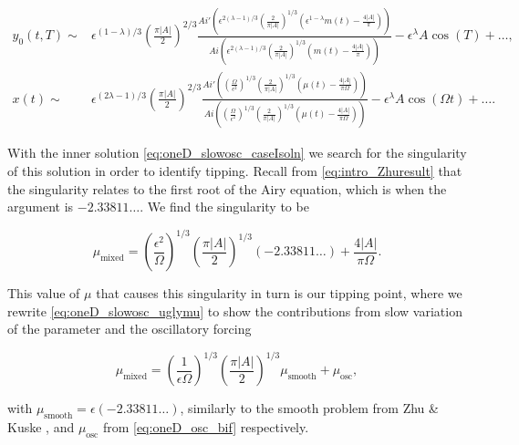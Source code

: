 \begin{equation}\label{eq:oneD_slowosc_caseIsoln}
\begin{aligned}
y_0(t,T)\sim& \epsilon^{(1-\lambda)/3}\left( \frac{\pi |A|}{2} \right)^{2/3}\frac{Ai'\left(\epsilon^{2(\lambda-1)/3}\left(\frac{2}{\pi |A|}\right)^{1/3}(\epsilon^{1-\lambda}m(t)-\frac{4|A|}{\pi})\right)}{Ai\left(\epsilon^{2(\lambda-1)/3}\left(\frac{2}{\pi |A|}\right)^{1/3}(m(t)-\frac{4|A|}{\pi})\right)}-\epsilon^\lambda A\cos(T)+\ldots,\\
x(t) \sim& \epsilon^{(2\lambda-1)/3}\left(\frac{\pi |A|}{2}\right)^{2/3}\frac{Ai'\left(\left(\frac{\Omega}{\epsilon^2}\right)^{1/3}\left(\frac{2}{\pi |A|}\right)^{1/3}(\mu(t)-\frac{4|A|}{\pi \Omega})\right)}{Ai\left(\left(\frac{\Omega}{\epsilon^2}\right)^{1/3}\left(\frac{2}{\pi |A|}\right)^{1/3}(\mu(t)-\frac{4|A|}{\pi \Omega})\right)}-\epsilon^\lambda A\cos(\Omega t) +\ldots.
\end{aligned}
\end{equation}

With the inner solution \eqref{eq:oneD_slowosc_caseIsoln} we search for the singularity of this solution in order to identify tipping. Recall from \eqref{eq:intro_Zhuresult} that the singularity relates to the first root of the Airy equation, which is when the argument is $-2.33811\ldots$. We find the singularity to be

\begin{equation}\label{eq:oneD_slowosc_uglymu}
\mu_{\text{mixed}}=\left(\frac{\epsilon^2}{\Omega}\right)^{1/3}\left(\frac{\pi |A|}{2}\right)^{1/3}(-2.33811\ldots)+\frac{4|A|}{\pi \Omega}.
\end{equation}

This value of $\mu$ that causes this singularity in turn is our tipping point, where we rewrite \eqref{eq:oneD_slowosc_uglymu} to show the contributions from slow variation of the parameter and the oscillatory forcing

\begin{equation}\label{eq:oneD_slowosc_caseItipping}
\mu_{\text{mixed}} = \left(\frac{1}{\epsilon\Omega}\right)^{1/3}\left(\frac{\pi |A|}{2}\right)^{1/3} \mu_{\text{smooth}}+\mu_{\text{osc}},
\end{equation}

with $\mu_{\text{smooth}}=\epsilon\left(-2.33811\ldots\right)$, similarly to the smooth problem from Zhu \& Kuske \cite{zhu2015tipping}, and $\mu_{\text{osc}}$ from \eqref{eq:oneD_osc_bif} respectively.

